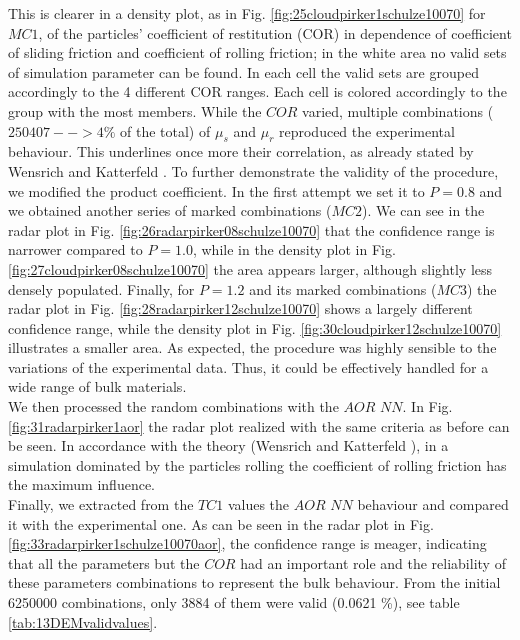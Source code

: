This is clearer in a density plot, as in Fig. 
\ref{fig:25cloudpirker1schulze10070} for $MC1$, 
of the particles' coefficient of restitution (COR) in dependence
of coefficient of sliding friction and coefficient of rolling friction; in the
white area no valid sets of simulation parameter can be found.
In each cell the valid sets are grouped accordingly to the 4 different COR
ranges.
Each cell is colored accordingly to the group with the most members. 
While the $COR$ varied, multiple
combinations ($250407 --> 4\% $ of the total) of $\mu_s$ and $\mu_r$ reproduced
the experimental behaviour.
This underlines once more their correlation, as already stated by Wensrich and 
Katterfeld \cite{RefWorks:87}.
To further demonstrate the validity of the procedure, we modified the product
coefficient. In the first attempt we set it to $P=0.8$ and we obtained another
series of marked combinations ($MC2$).
We can see in the radar plot in Fig.
\ref{fig:26radarpirker08schulze10070} that the confidence range is narrower
compared to $P=1.0$, while in the density plot in Fig. 
\ref{fig:27cloudpirker08schulze10070} the area
appears larger, although slightly less densely populated. Finally, for $P=1.2$
and its marked combinations ($MC3$) the radar plot in Fig.
\ref{fig:28radarpirker12schulze10070} shows a largely different confidence
range, while the density plot in Fig. \ref{fig:30cloudpirker12schulze10070} 
illustrates a smaller area. As expected, the procedure was highly sensible to the variations of the experimental data. 
Thus, it could be effectively handled for a wide range of bulk materials.\\
We then processed the random combinations with the $AOR$ $NN$. In Fig.
\ref{fig:31radarpirker1aor} the radar plot realized with the same criteria as
before can be seen.
In accordance with the theory (Wensrich and Katterfeld \cite{RefWorks:87}), in a simulation dominated
by the particles rolling the coefficient of rolling friction has the maximum
influence. \\
Finally, we extracted from the $TC1$ values the $AOR$ $NN$ behaviour
and compared it with the experimental one.
As can be seen in the radar plot in Fig.
\ref{fig:33radarpirker1schulze10070aor}, the confidence range is meager, indicating that all the parameters but the $COR$ 
had an important role and the reliability of these parameters combinations to represent the bulk behaviour. 
From the initial 6250000 combinations, only 3884 of them were valid (0.0621 \%),
see table \ref{tab:13DEMvalidvalues}.






